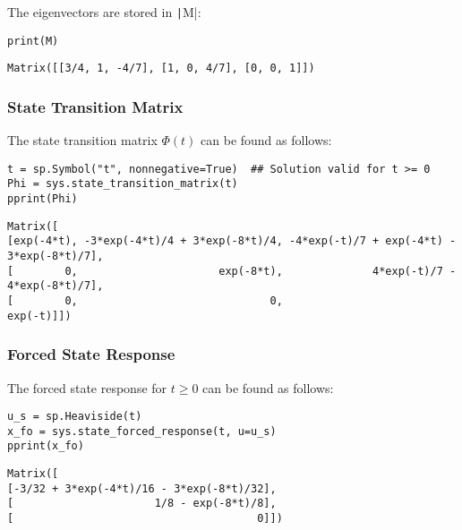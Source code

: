 The eigenvectors are stored in \texttt|M|:

\label{024a5ed7}
\nointerlineskip\nointerlineskip\begin{verbatim}
print(M)
\end{verbatim}

\nointerlineskip\nointerlineskip\begin{verbatim}
Matrix([[3/4, 1, -4/7], [1, 0, 4/7], [0, 0, 1]])
\end{verbatim}

\label{0448c950}
\subsubsection{State Transition Matrix}\label{state-transition-matrix}

The state transition matrix $\Phi(t)$ can be found as follows:

\label{7d9946da}
\nointerlineskip\nointerlineskip\begin{verbatim}
t = sp.Symbol("t", nonnegative=True)  ## Solution valid for t >= 0
Phi = sys.state_transition_matrix(t)
pprint(Phi)
\end{verbatim}

\nointerlineskip\nointerlineskip\begin{verbatim}
Matrix([
[exp(-4*t), -3*exp(-4*t)/4 + 3*exp(-8*t)/4, -4*exp(-t)/7 + exp(-4*t) - 3*exp(-8*t)/7],
[        0,                      exp(-8*t),              4*exp(-t)/7 - 4*exp(-8*t)/7],
[        0,                              0,                                  exp(-t)]])
\end{verbatim}

\label{76bc68e6}
\subsubsection{Forced State Response}\label{forced-state-response}

The forced state response for $t \ge 0$ can be found as follows:

\label{9b10d000}
\nointerlineskip\nointerlineskip\begin{verbatim}
u_s = sp.Heaviside(t)
x_fo = sys.state_forced_response(t, u=u_s)
pprint(x_fo)
\end{verbatim}

\nointerlineskip\nointerlineskip\begin{verbatim}
Matrix([
[-3/32 + 3*exp(-4*t)/16 - 3*exp(-8*t)/32],
[                      1/8 - exp(-8*t)/8],
[                                      0]])
\end{verbatim}

